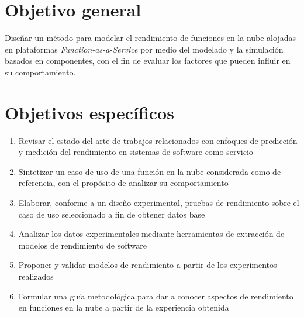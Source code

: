 \section{Objetivo general}
Diseñar un método para modelar el rendimiento de funciones en la nube alojadas en plataformas \emph{Function-as-a-Service} por medio del modelado y la simulación basados en componentes, con el fin de evaluar los factores que pueden influir en su comportamiento. 

\section{Objetivos específicos}
\begin{enumerate}
    \item Revisar el estado del arte de trabajos relacionados con enfoques de predicción y medición del rendimiento en sistemas de software como servicio
    \item Sintetizar un caso de uso de una función en la nube considerada como de referencia, con el propósito de analizar su comportamiento
    \item Elaborar, conforme a un diseño experimental, pruebas de rendimiento sobre el caso de uso seleccionado a fin de obtener datos base
    \item Analizar los datos experimentales mediante herramientas de extracción de modelos de rendimiento de software 
    \item Proponer y validar modelos de rendimiento a partir de los experimentos realizados 
    \item Formular una guía metodológica para dar a conocer aspectos de rendimiento en funciones en la nube a partir de la experiencia obtenida
   
    
\end{enumerate}